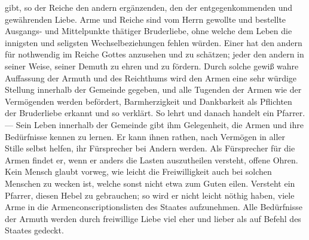gibt, so der Reiche den andern ergänzenden, den der entgegenkommenden und gewährenden Liebe. Arme und Reiche sind vom Herrn gewollte und bestellte Ausgangs- und Mittelpunkte thätiger Bruderliebe, ohne welche dem Leben die innigsten und seligsten Wechselbeziehungen fehlen würden. Einer hat den andern für nothwendig im Reiche Gottes anzusehen und zu schätzen; jeder den andern in seiner Weise, seiner Demuth zu ehren und zu fördern. Durch solche gewiß wahre Auffassung der Armuth und des Reichthums wird den Armen eine sehr würdige Stellung innerhalb der Gemeinde gegeben, und alle Tugenden der Armen wie der Vermögenden werden befördert, Barmherzigkeit und Dankbarkeit als Pflichten der Bruderliebe erkannt und so verklärt. So lehrt und danach handelt ein Pfarrer. — Sein Leben innerhalb der Gemeinde gibt ihm Gelegenheit, die Armen und ihre Bedürfnisse kennen zu lernen. Er kann ihnen rathen, nach Vermögen in aller Stille selbst helfen, ihr Fürsprecher bei Andern werden. Als Fürsprecher für die Armen findet er, wenn er anders die Lasten auszutheilen versteht, offene Ohren. Kein Mensch glaubt vorweg, wie leicht die Freiwilligkeit auch bei solchen Menschen zu wecken ist, welche sonst nicht etwa zum Guten eilen. Versteht ein Pfarrer, diesen Hebel zu gebrauchen; so wird er nicht leicht nöthig haben, viele Arme in die Armenconscriptionslisten des Staates aufzunehmen. Alle Bedürfnisse der Armuth werden durch freiwillige Liebe viel eher und lieber als auf Befehl des Staates gedeckt.

